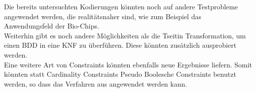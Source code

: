 \documentclass[a4,abstract=on]{scrartcl}
\begin{document}
Die bereits untersuchten Kodierungen könnten noch auf andere Testprobleme angewendet werden, die realitätsnaher sind, wie zum Beispiel das Anwendungsfeld der Bio-Chips.\\
Weiterhin gibt es noch andere Möglichkeiten als die Tseitin Transformation, um einen BDD in eine KNF zu überführen. Diese könnten zusätzlich ausprobiert werden.\\
Eine weitere Art von Constraints könnten ebenfalls neue Ergebnisse liefern. Somit könnten statt Cardinality Constraints Pseudo Boolesche Constraints benutzt werden, so dass das Verfahren aus \citet[][Seite 15,16]{niklasse} angewendet werden kann.




\end{document}
